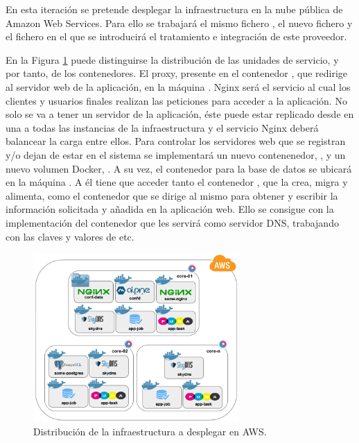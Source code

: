 En esta iteración se pretende desplegar la infraestructura en la nube pública de Amazon Web Services. Para ello se trabajará el mismo fichero , el nuevo fichero  y el fichero  en el que se introducirá el tratamiento e integración de este proveedor.

En la Figura \ref{fig:aws-1-iteration} puede distinguirse la distribución de las unidades de servicio, y por tanto, de los contenedores. El proxy, presente en el contenedor , que redirige al servidor web de la aplicación, en la máquina . Nginx será el servicio al cual los clientes y usuarios finales realizan las peticiones para acceder a la aplicación. No solo se va a tener un servidor de la aplicación, éste puede estar replicado desde en una a todas las instancias de la infraestructura y el servicio Nginx deberá balancear la carga entre ellos. Para controlar los servidores web que se registran y/o dejan de estar en el sistema se implementará un nuevo contenenedor, , y un nuevo volumen Docker, . A su vez, el contenedor  para la base de datos se ubicará en la máquina . A él tiene que acceder tanto el contenedor , que la crea, migra y alimenta, como el contenedor  que se dirige al mismo para obtener y escribir la información solicitada y añadida en la aplicación web. Ello se consigue con la implementación del contenedor  que les servirá como servidor DNS, trabajando con las claves y valores de etc.

\begin{figure}[H]
\centering
\includegraphics[width=0.7\textwidth]{images/figures/aws-1-iteration.png}
\caption{Distribución de la infraestructura a desplegar en AWS. \label{fig:aws-1-iteration}}
\label{fig:aws-1-iteration}
\end{figure}

